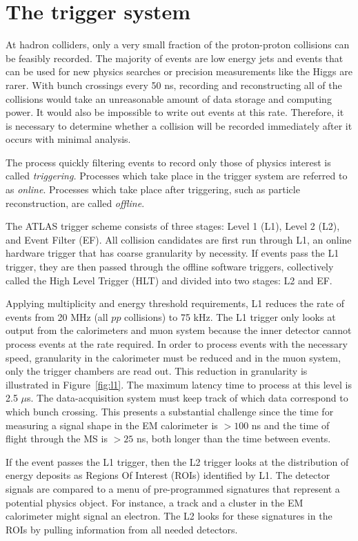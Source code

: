 \section{The trigger system}
At hadron colliders, only a very small fraction of the proton-proton collisions can be feasibly recorded. The majority of events are low energy jets and events that can be used for new physics searches or precision measurements like the Higgs are rarer. With bunch crossings every 50 ns, recording and reconstructing all of the collisions would take an unreasonable amount of data storage and computing power. It would also be impossible to write out events at this rate. Therefore, it is necessary to determine whether a collision will be recorded immediately after it occurs with minimal analysis. 

The process quickly filtering events to record only those of physics interest is called \emph{triggering.} Processes which take place in the trigger system are referred to as \emph{online}. Processes which take place after triggering, such as particle reconstruction, are called \emph{offline}.

The ATLAS trigger scheme\cite{TDR-L1} consists of three stages: Level 1 (L1), Level 2 (L2), and Event Filter (EF). All collision candidates are first run through L1, an online hardware trigger that has coarse granularity by necessity. If events pass the L1 trigger, they are then passed through the offline software triggers, collectively called the High Level Trigger (HLT) and divided into two stages: L2 and EF.

Applying multiplicity and energy threshold requirements, L1 reduces the rate of events from 20 MHz (all $pp$ collisions) to 75 kHz. The L1 trigger only looks at output from the calorimeters and muon system because the inner detector cannot process events at the rate required. In order to process events with the necessary speed, granularity in the calorimeter must be reduced and in the muon system, only the trigger chambers are read out. This reduction in granularity is illustrated in Figure~\ref{fig:l1}. The maximum latency time to process at this level is 2.5 $\mu$s. The data-acquisition system must keep track of which data correspond to which bunch crossing. This presents a substantial challenge since the time for measuring a signal shape in the EM calorimeter is $>100$ ns and the time of flight through the MS is $>25$ ns, both longer than the time between events. 

If the event passes the L1 trigger, then the L2 trigger looks at the distribution of energy deposits as Regions Of Interest (ROIs) identified by L1. The detector signals are compared to a menu of pre-programmed signatures that represent a potential physics object. For instance, a track and a cluster in the EM calorimeter might signal an electron. The L2 looks for these signatures in the ROIs by pulling information from all needed detectors. 

